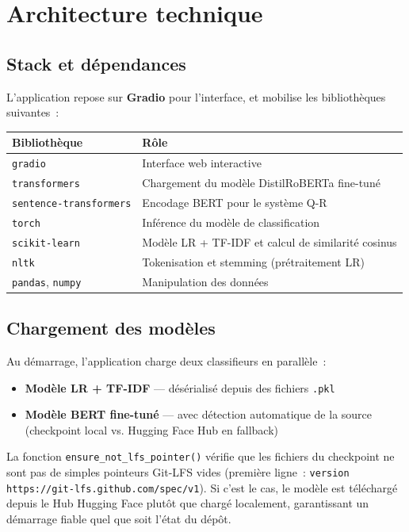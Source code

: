 \documentclass[12pt,a4paper]{report}
\begin{document}
\section{Architecture technique}

\subsection{Stack et dépendances}

L'application repose sur \textbf{Gradio} pour l'interface, et mobilise les bibliothèques
suivantes~:

\begin{center}
\begin{tabular}{@{}ll@{}}
\toprule
\textbf{Bibliothèque} & \textbf{Rôle} \\
\midrule
\texttt{gradio}               & Interface web interactive \\
\texttt{transformers}         & Chargement du modèle DistilRoBERTa fine-tuné \\
\texttt{sentence-transformers} & Encodage BERT pour le système Q-R \\
\texttt{torch}                & Inférence du modèle de classification \\
\texttt{scikit-learn}         & Modèle LR + TF-IDF et calcul de similarité cosinus \\
\texttt{nltk}                 & Tokenisation et stemming (prétraitement LR) \\
\texttt{pandas}, \texttt{numpy} & Manipulation des données \\
\bottomrule
\end{tabular}
\end{center}

\subsection{Chargement des modèles}

Au démarrage, l'application charge deux classifieurs en parallèle~:

\begin{itemize}
\item \textbf{Modèle LR + TF-IDF} — désérialisé depuis des fichiers \texttt{.pkl}
\item \textbf{Modèle BERT fine-tuné} — avec détection automatique de la source (checkpoint local vs. Hugging Face Hub en fallback)
\end{itemize}

\begin{tip}
La fonction \texttt{ensure\_not\_lfs\_pointer()} vérifie que les fichiers du checkpoint
ne sont pas de simples pointeurs Git-LFS vides (première ligne~: 
\texttt{version https://git-lfs.github.com/spec/v1}). Si c'est le cas, le modèle
est téléchargé depuis le Hub Hugging Face plutôt que chargé localement, garantissant
un démarrage fiable quel que soit l'état du dépôt.
\end{tip}
\end{document}
